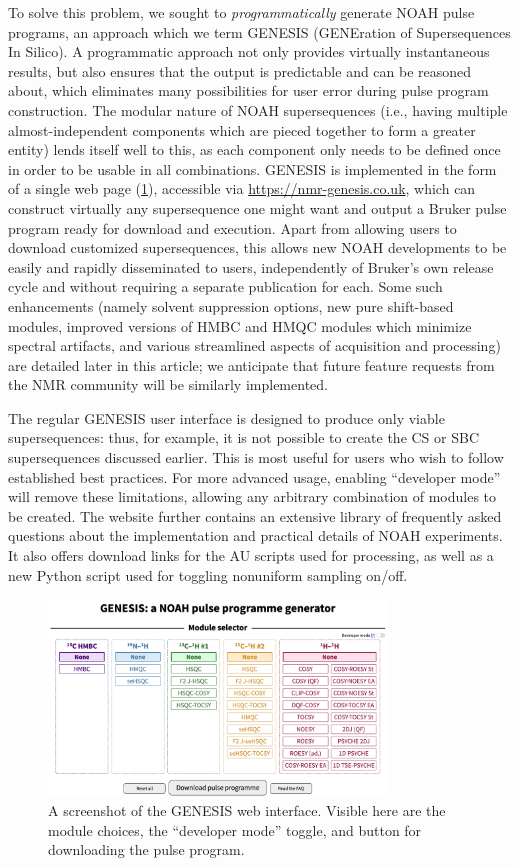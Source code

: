 \documentclass[a4paper,11pt]{article}
\newcommand{\theurl}{\url{https://nmr-genesis.co.uk}}
\begin{document}
\begin{refsection}
To solve this problem, we sought to \textit{programmatically} generate NOAH pulse programs, an approach which we term GENESIS (GENEration of Supersequences In Silico).
A programmatic approach not only provides virtually instantaneous results, but also ensures that the output is predictable and can be reasoned about, which eliminates many possibilities for user error during pulse program construction.
The modular nature of NOAH supersequences (i.e., having multiple almost-independent components which are pieced together to form a greater entity) lends itself well to this, as each component only needs to be defined once in order to be usable in all combinations.
GENESIS is implemented in the form of a single web page (\cref{fig:screenshot}), accessible via \theurl{}, which can construct virtually any supersequence one might want and output a Bruker pulse program ready for download and execution.
Apart from allowing users to download customized supersequences, this allows new NOAH developments to be easily and rapidly disseminated to users, independently of Bruker's own release cycle and without requiring a separate publication for each.
Some such enhancements (namely solvent suppression options, new pure shift-based modules, improved versions of HMBC and HMQC modules which minimize spectral artifacts, and various streamlined aspects of acquisition and processing) are detailed later in this article; we anticipate that future feature requests from the NMR community will be similarly implemented.

The regular GENESIS user interface is designed to produce only viable supersequences: thus, for example, it is not possible to create the CS or SBC supersequences discussed earlier.
This is most useful for users who wish to follow established best practices.
For more advanced usage, enabling ``developer mode'' will remove these limitations, allowing any arbitrary combination of modules to be created.
The website further contains an extensive library of frequently asked questions about the implementation and practical details of NOAH experiments.
It also offers download links for the AU scripts used for processing, as well as a new Python script used for toggling nonuniform sampling on/off.


\begin{figure}
    \centering
    \includegraphics[width=0.8\textwidth]{screenshot.png}
    \caption{
        A screenshot of the GENESIS web interface.
        Visible here are the module choices, the ``developer mode'' toggle, and button for downloading the pulse program.
    }
    \label{fig:screenshot}
\end{figure}


\end{refsection}
\end{document}
